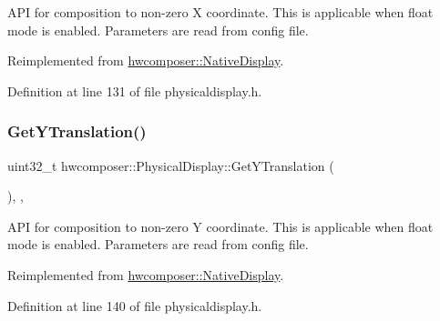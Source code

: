 A\+PI for composition to non-\/zero X coordinate. This is applicable when float mode is enabled. Parameters are read from config file. 

Reimplemented from \mbox{\hyperlink{classhwcomposer_1_1NativeDisplay_a1f934e9ab6149fb35bd2868605c215dd}{hwcomposer\+::\+Native\+Display}}.



Definition at line 131 of file physicaldisplay.\+h.


\begin{DoxyCode}{0}
\end{DoxyCode}
\mbox{\label{classhwcomposer_1_1PhysicalDisplay_a7c390445fe926da9b501187678d1cb04}} 
\subsubsection{\texorpdfstring{Get\+Y\+Translation()}{GetYTranslation()}}
{\footnotesize\ttfamily uint32\+\_\+t hwcomposer\+::\+Physical\+Display\+::\+Get\+Y\+Translation (\begin{DoxyParamCaption}{ }\end{DoxyParamCaption})\hspace{0.3cm}{\ttfamily [inline]}, {\ttfamily [override]}, {\ttfamily [virtual]}}

A\+PI for composition to non-\/zero Y coordinate. This is applicable when float mode is enabled. Parameters are read from config file. 

Reimplemented from \mbox{\hyperlink{classhwcomposer_1_1NativeDisplay_a761f39e34a12a88b4f8a4c1ef49e2b10}{hwcomposer\+::\+Native\+Display}}.



Definition at line 140 of file physicaldisplay.\+h.


\begin{DoxyCode}{0}
\end{DoxyCode}
\mbox{\label{classhwcomposer_1_1PhysicalDisplay_ab8e24e90adf5eaa76da5cb827ad82c65}} 
